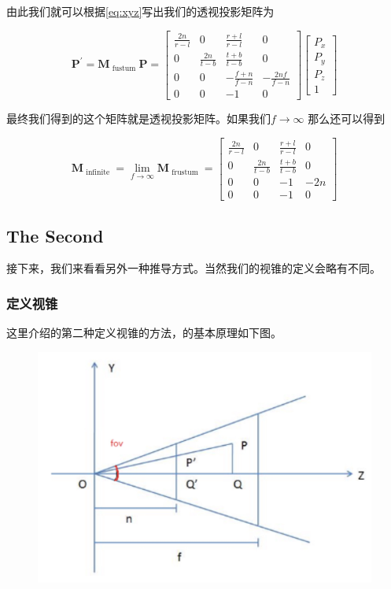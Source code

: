 \documentclass{article} \usepackage{braket} \usepackage{amsmath,amssymb} \usepackage{geometry} \usepackage{graphicx} \usepackage{braket} \usepackage{bm}\usepackage{hyperref} \usepackage{CJKutf8}
\begin{document}
\begin{CJK}{UTF8}{gbsn}
  由此我们就可以根据\eqref{eq:xyz}写出我们的透视投影矩阵为

  \begin{equation}
    \label{eq:proj}
    \mathbf{P}^{\prime}=\mathbf{M}_{\text { fustum }} \mathbf{P}=
    \left[
      \begin{array}{cccc}
        {\frac{2 n}{r-l}} & {0} & {\frac{r+l}{r-l}} & {0} \\
        {0} & {\frac{2 n}{t-b}} & {\frac{t+b}{t-b}} & {0} \\
        {0} & {0} & {-\frac{f+n}{f-n}} & {-\frac{2 n f}{f-n}} \\
        {0} & {0} & {-1} & {0}
      \end{array}\right]
    \left[
      \begin{array}{c}{P_{x}} \\
        {P_{y}} \\
        {P_{z}}
        \\ {1}
      \end{array}
    \right]
  \end{equation}

  最终我们得到的这个矩阵就是透视投影矩阵。如果我们$f\rightarrow \infty$ 那么还可以得到

  \begin{equation}
    \label{eq:projinf}
    \mathbf{M}_{\text { infinite }}=\lim _{f \rightarrow \infty} \mathbf{M}_{\text { frustum }}=\left[\begin{array}{cccc}{\frac{2 n}{r-l}} & {0} & {\frac{r+l}{r-l}} & {0} \\ {0} & {\frac{2 n}{t-b}} & {\frac{t+b}{t-b}} & {0} \\ {0} & {0} & {-1} & {-2 n} \\ {0} & {0} & {-1} & {0}\end{array}\right]
  \end{equation}

  \subsection{The Second}

  接下来，我们来看看另外一种推导方式。当然我们的视锥的定义会略有不同。
  
  \subsubsection{定义视锥}

  这里介绍的第二种定义视锥的方法，的基本原理如下图。
  \begin{figure}[htbp]
    \centering
    \includegraphics[width=0.6\linewidth]{pic-6.jpg}
  \end{figure}


\end{CJK}
\end{document}
